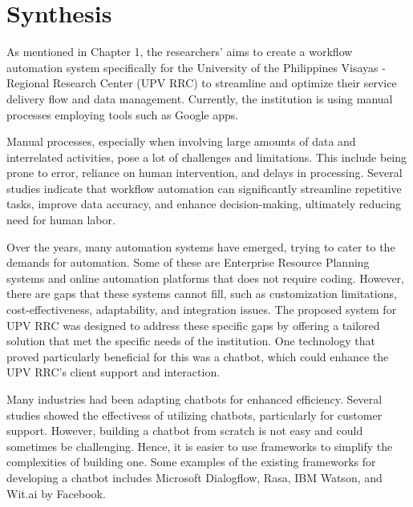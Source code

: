 \section{Synthesis}

As mentioned in Chapter 1, the researchers' aims to create a workflow automation system specifically for the University of the Philippines Visayas - Regional Research Center (UPV RRC) to streamline and optimize their service delivery flow and data management. Currently, the institution is using manual processes employing tools such as Google apps.

Manual processes, especially when involving large amounts of data and interrelated activities, pose a lot of challenges and limitations. This include being prone to error, reliance on human intervention, and delays in processing. Several studies indicate that workflow automation can significantly streamline repetitive tasks, improve data accuracy, and enhance decision-making, ultimately reducing need for human labor. 

Over the years, many automation systems have emerged, trying to cater to the demands for automation. Some of these are Enterprise Resource Planning systems and online automation platforms that does not require coding. However, there are gaps that these systems cannot fill, such as customization limitations, cost-effectiveness, adaptability, and integration issues. The proposed system for UPV RRC was designed to address these specific gaps by offering a tailored solution that met the specific needs of the institution. One technology that proved particularly beneficial for this was a chatbot, which could enhance the UPV RRC’s client support and interaction.

Many industries had been adapting chatbots for enhanced efficiency. Several studies showed the effectivess of utilizing chatbots, particularly for customer support. However, building a chatbot from scratch is not easy and could sometimes be challenging. Hence, it is easier to use frameworks to simplify the complexities of building one. Some examples of the existing frameworks for developing a chatbot includes Microsoft Dialogflow, Rasa, IBM Watson, and Wit.ai by Facebook.